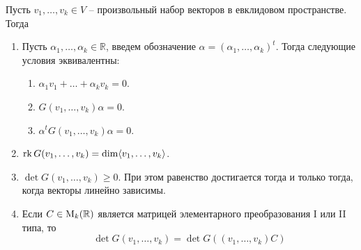 \begin{claim}
\label{claim::GramMatrixFull}
Пусть $v_1,\ldots,v_k\in V$ -- произвольный набор векторов в евклидовом пространстве.
Тогда
\begin{enumerate}
\item Пусть $\alpha_1,\ldots,\alpha_k \in \mathbb R$, введем обозначение $\alpha = (\alpha_1,\ldots,\alpha_k)^t$.
Тогда следующие условия эквивалентны:
\begin{enumerate}
\item $\alpha_1 v_1 + \ldots + \alpha_k v_k = 0$.

\item $G(v_1,\ldots,v_k)\alpha= 0$.

\item $\alpha^tG(v_1,\ldots,v_k)\alpha= 0$.
\end{enumerate}
\item $\operatorname{rk} G(v_1,\ldots,v_k) = \dim \langle v_1,\ldots,v_k\rangle$.

\item  $\det G(v_1,\ldots,v_k)\geqslant 0$.
При этом равенство достигается тогда и только тогда, когда векторы линейно зависимы.

\item Если $C\in\operatorname{M}_{k}(\mathbb R)$ является матрицей элементарного преобразования I или II типа, то 
\[
\det G(v_1,\ldots,v_k) = \det G((v_1,\ldots,v_k)C)
\]
\end{enumerate}
\end{claim}
